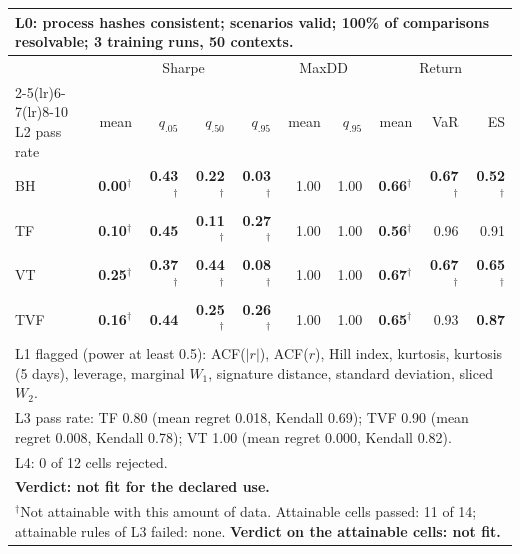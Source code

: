 \begin{tabular}{lrrrrrrrrr}
\toprule
\multicolumn{10}{p{13.5cm}}{L0: process hashes consistent; scenarios valid; 100\% of comparisons resolvable; 3 training runs, 50 contexts.} \\
\midrule
 & \multicolumn{4}{c}{Sharpe} & \multicolumn{2}{c}{MaxDD} & \multicolumn{3}{c}{Return} \\
\cmidrule(lr){2-5}\cmidrule(lr){6-7}\cmidrule(lr){8-10}
L2 pass rate & mean & $q_{.05}$ & $q_{.50}$ & $q_{.95}$ & mean & $q_{.95}$ & mean & VaR & ES \\
\midrule
BH & \textbf{0.00}$^{\dagger}$ & \textbf{0.43}$^{\dagger}$ & \textbf{0.22}$^{\dagger}$ & \textbf{0.03}$^{\dagger}$ & 1.00 & 1.00 & \textbf{0.66}$^{\dagger}$ & \textbf{0.67}$^{\dagger}$ & \textbf{0.52}$^{\dagger}$ \\
TF & \textbf{0.10}$^{\dagger}$ & \textbf{0.45} & \textbf{0.11}$^{\dagger}$ & \textbf{0.27}$^{\dagger}$ & 1.00 & 1.00 & \textbf{0.56}$^{\dagger}$ & 0.96 & 0.91 \\
VT & \textbf{0.25}$^{\dagger}$ & \textbf{0.37}$^{\dagger}$ & \textbf{0.44}$^{\dagger}$ & \textbf{0.08}$^{\dagger}$ & 1.00 & 1.00 & \textbf{0.67}$^{\dagger}$ & \textbf{0.67}$^{\dagger}$ & \textbf{0.65}$^{\dagger}$ \\
TVF & \textbf{0.16}$^{\dagger}$ & \textbf{0.44} & \textbf{0.25}$^{\dagger}$ & \textbf{0.26}$^{\dagger}$ & 1.00 & 1.00 & \textbf{0.65}$^{\dagger}$ & 0.93 & \textbf{0.87} \\
\midrule
\multicolumn{10}{p{13.5cm}}{L1 flagged (power at least 0.5): ACF($|r|$), ACF($r$), Hill index, kurtosis, kurtosis (5 days), leverage, marginal $W_1$, signature distance, standard deviation, sliced $W_2$.} \\
\multicolumn{10}{p{13.5cm}}{L3 pass rate: TF 0.80 (mean regret 0.018, Kendall 0.69); TVF 0.90 (mean regret 0.008, Kendall 0.78); VT 1.00 (mean regret 0.000, Kendall 0.82).} \\
\multicolumn{10}{p{13.5cm}}{L4: 0 of 12 cells rejected.} \\
\multicolumn{10}{p{13.5cm}}{\textbf{Verdict: not fit for the declared use.}} \\
\multicolumn{10}{p{13.5cm}}{$^{\dagger}$Not attainable with this amount of data. Attainable cells passed: 11 of 14; attainable rules of L3 failed: none. \textbf{Verdict on the attainable cells: not fit.}} \\
\bottomrule
\end{tabular}
